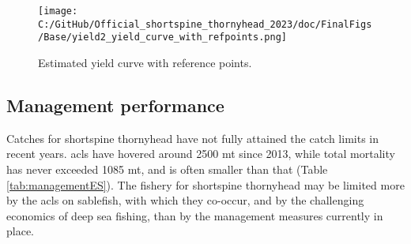 \documentclass[11pt,
  letterpaper,
]{article}
\begin{document}
\begin{figure}
\centering
\texttt{[image: C:/GitHub/Official\_shortspine\_thornyhead\_2023/doc/FinalFigs/Base/yield2\_yield\_curve\_with\_refpoints.png]}
\caption{Estimated yield curve with reference points.\label{fig:yieldcurveES}}
\end{figure}

\hypertarget{management-performance}{%
\subsection*{Management performance}\label{management-performance}}

Catches for shortspine thornyhead have not fully attained the catch limits in recent years. \Gls{acl}s have hovered around 2500 mt since 2013, while total mortality has never exceeded 1085 mt, and is often smaller than that (Table \ref{tab:managementES}). The fishery for shortspine thornyhead may be limited more by the \gls{acl}s on sablefish, with which they co-occur, and by the challenging economics of deep sea fishing, than by the management measures currently in place. \begingroup\fontsize{10}{12}\selectfont \begingroup\fontsize{10}{12}\selectfont
\end{document}
